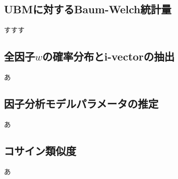 \subsection{UBMに対するBaum-Welch統計量}
すすす
\subsection{全因子$w$の確率分布とi-vectorの抽出}
あ
\subsection{因子分析モデルパラメータの推定}
あ
\subsection{コサイン類似度}
あ
